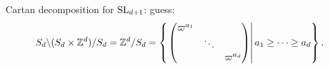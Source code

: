 \documentclass{article}
\newcommand{\bico}[3]{{#2}\backslash {#1}\slash {#3}}
\begin{document}
Cartan decomposition for $\operatorname{SL}_{d+1}$:
guess: \[\bico{(S_d\times\Z^d)}{S_d}{S_d} = \Z^d/S_d = \left\{ 
    \left.\begin{pmatrix}
        \varpi^{a_1} & & \\ & \ddots & \\ &  &\varpi^{a_d}
    \end{pmatrix}\right| a_1\ge \cdots\ge a_d
 \right\}.\]
\end{document}
